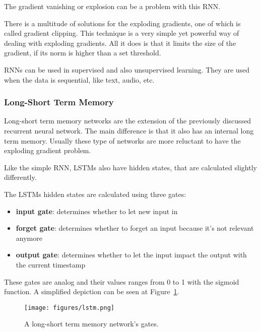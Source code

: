 The gradient vanishing or explosion can be a problem with this RNN.

There is a multitude of solutions for the exploding gradients, one of which is called gradient clipping. This technique is a very simple yet powerful way of dealing with exploding gradients. All it does is that it limits the size of the gradient, if its norm is higher than a set threshold.

RNNs can be used in supervised and also unsupervised learning. They are used when the data is sequential, like text, audio, etc.


\subsubsection{Long-Short Term Memory}
Long-short term memory networks are the extension of the previously discussed recurrent neural network. The main difference is that it also has an internal long term memory. Usually these type of networks are more reluctant to have the exploding gradient problem.

Like the simple RNN, LSTMs also have hidden states, that are calculated slightly differently.
\\


\begin{minipage}{\textwidth}
	The LSTMs hidden states are calculated using three gates:
	\begin{itemize}
		\item \textbf{input gate}: determines whether to let new input in
		\item \textbf{forget gate}: determines whether to forget an input because it's not relevant anymore
		\item \textbf{output gate}: determines whether to let the input impact the output with the current timestamp
	\end{itemize}
\end{minipage}

These gates are analog and their values ranges from 0 to 1 with the sigmoid function. A simplified depiction can be seen at Figure~\ref{fig:lstm}.
\begin{figure}[!ht]
	\centering
	\texttt{[image: figures/lstm.png]}
	\caption{A long-short term memory network's gates.}
	\label{fig:lstm}
\end{figure}

